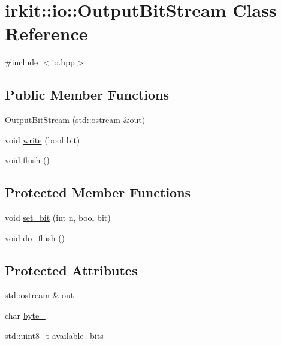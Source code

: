 \hypertarget{classirkit_1_1io_1_1OutputBitStream}{}\section{irkit\+:\+:io\+:\+:Output\+Bit\+Stream Class Reference}
\label{classirkit_1_1io_1_1OutputBitStream}


{\ttfamily \#include $<$io.\+hpp$>$}

\subsection*{Public Member Functions}
\begin{DoxyCompactItemize}
\item 
\mbox{\hyperlink{classirkit_1_1io_1_1OutputBitStream_aa6e2d1ca85cfc43eb9381e157fcc47d7}{Output\+Bit\+Stream}} (std\+::ostream \&out)
\item 
void \mbox{\hyperlink{classirkit_1_1io_1_1OutputBitStream_a14b965e9e31ca3308360232ac0ef09a3}{write}} (bool bit)
\item 
void \mbox{\hyperlink{classirkit_1_1io_1_1OutputBitStream_a90aa2fb154eb234c4bc6f73b1155b4c5}{flush}} ()
\end{DoxyCompactItemize}
\subsection*{Protected Member Functions}
\begin{DoxyCompactItemize}
\item 
void \mbox{\hyperlink{classirkit_1_1io_1_1OutputBitStream_a709d4539ea99c9164f80b3682c89a1e7}{set\+\_\+bit}} (int n, bool bit)
\item 
void \mbox{\hyperlink{classirkit_1_1io_1_1OutputBitStream_a703b2324cbef6ce8aa49edc51aad5ad6}{do\+\_\+flush}} ()
\end{DoxyCompactItemize}
\subsection*{Protected Attributes}
\begin{DoxyCompactItemize}
\item 
std\+::ostream \& \mbox{\hyperlink{classirkit_1_1io_1_1OutputBitStream_ad763624a81752e5d25dd5f1513547fb1}{out\+\_\+}}
\item 
char \mbox{\hyperlink{classirkit_1_1io_1_1OutputBitStream_af3750a10467c8ad0220b5d019d0a9665}{byte\+\_\+}}
\item 
std\+::uint8\+\_\+t \mbox{\hyperlink{classirkit_1_1io_1_1OutputBitStream_a9ae4b2e9111bc7c88c4d819012813fe1}{available\+\_\+bits\+\_\+}}
\end{DoxyCompactItemize}


